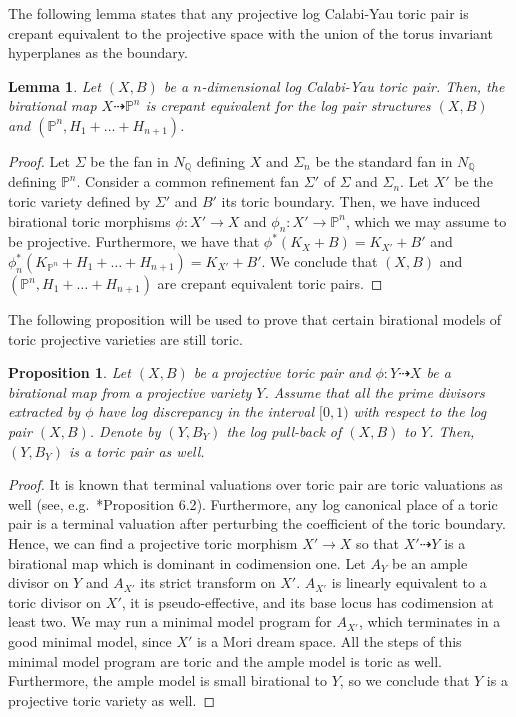 \documentclass{amsart}
\newcommand{\pp}{\mathbb{P}}
\renewcommand{\qq}{\mathbb{Q}}
\newtheorem{lemma}[theorem]{Lemma}
\newtheorem{proposition}[theorem]{Proposition}
\theoremstyle{remark}
\numberwithin{equation}{section}
\begin{document}
The following lemma states that any projective log Calabi-Yau toric pair is crepant equivalent  to the projective space with the union of the torus invariant hyperplanes as the boundary.

\begin{lemma}\label{lem:toric-bir-pn}
Let $(X,B)$ be a $n$-dimensional log Calabi-Yau toric pair.
Then, the birational map
$X\dashrightarrow \pp^n$ is crepant equivalent 
for the log pair structures
$(X,B)$ and $(\pp^n,H_1+\dots+H_{n+1})$.
\end{lemma}

\begin{proof}
Let $\Sigma$ be the fan in $N_\qq$ defining $X$
and $\Sigma_n$ be the standard fan in $N_\qq$ defining $\pp^n$.
Consider a common refinement fan $\Sigma'$ of $\Sigma$ and $\Sigma_n$.
Let $X'$ be the toric variety defined by $\Sigma'$ and $B'$ its toric boundary.
Then, we have induced birational toric morphisms
$\phi\colon X'\rightarrow X$ and
$\phi_n \colon X'\rightarrow \pp^n$, which we may assume to be projective.
Furthermore, we have that
$\phi^*(K_X+B)=K_{X'}+B'$
and 
$\phi_n^*(K_{\pp^n}+H_1+\dots+H_{n+1})=
K_{X'}+B'$.
We conclude that $(X,B)$ and $(\pp^n,H_1+\dots+H_{n+1})$ are crepant equivalent  toric pairs.
\end{proof}

The following proposition will be used to prove that certain birational models of toric projective varieties are still toric.

\begin{proposition}\label{prop:birational-toric}
Let $(X,B)$ be a projective toric pair
and $\phi\colon Y\dashrightarrow X$ be a birational map from a projective variety $Y$.
Assume that all the prime divisors extracted by $\phi$ have log discrepancy in the interval $[0,1)$ with respect to the log pair $(X,B)$.
Denote by $(Y,B_Y)$ the log pull-back of $(X,B)$ to $Y$.
Then, $(Y,B_Y)$ is a toric pair as well.
\end{proposition}

\begin{proof}
It is known that terminal valuations over toric pair are toric valuations as well (see, e.g.~\cite{dFdC16}*{Proposition 6.2}).
Furthermore, any log canonical place of a toric pair is a terminal valuation after perturbing the coefficient of the toric boundary.
Hence, we can find a projective toric morphism
$X'\rightarrow X$ so that
$X'\dashrightarrow Y$ is a birational map which is dominant in codimension one.
Let $A_Y$ be an ample divisor on $Y$
and $A_{X'}$ its strict transform on $X'$.
$A_{X'}$ is linearly equivalent to a toric divisor on $X'$, it is pseudo-effective, and its base locus has codimension at least two.
We may run a minimal model program for $A_{X'}$, which terminates in a good minimal model, since $X'$ is a Mori dream space.
All the steps of this minimal model program are toric and the ample model is toric as well.
Furthermore, the ample model is small birational to $Y$, so we conclude that $Y$ is a projective toric variety as well.
\end{proof}
\end{document}
